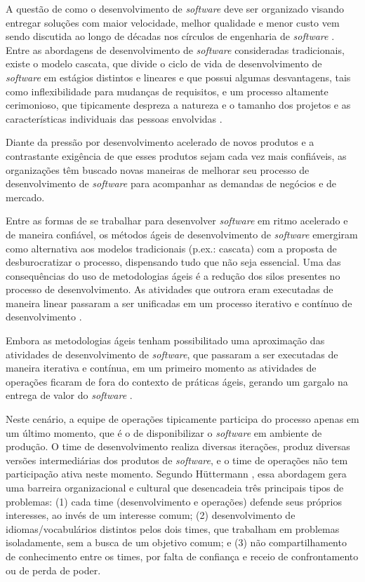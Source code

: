 A questão de como o desenvolvimento de \textit{software} deve ser
organizado visando entregar soluções com maior velocidade, melhor qualidade e
menor custo vem sendo discutida ao longo de décadas nos círculos de engenharia
de \textit{software} \cite{empirical_studies_agile}. Entre as abordagens de
desenvolvimento de \textit{software} consideradas tradicionais, existe o modelo
cascata, que divide o ciclo de vida de desenvolvimento de \textit{software} em
estágios distintos e lineares e que possui algumas desvantagens, tais como
inflexibilidade para mudanças de requisitos, e um processo altamente
cerimonioso, que tipicamente despreza a natureza e o tamanho dos projetos e as características individuais
das pessoas envolvidas \cite{software_quality_agile}.

Diante da pressão por desenvolvimento acelerado de novos produtos e a
contrastante exigência de que esses produtos sejam cada vez mais confiáveis,
as organizações têm buscado novas maneiras de melhorar seu processo de
desenvolvimento de \textit{software} para acompanhar as demandas de negócios e
de mercado.

Entre as formas de se trabalhar para desenvolver \textit{software} em ritmo
acelerado e de maneira confiável, os métodos ágeis de desenvolvimento de
\textit{software} emergiram como alternativa aos modelos tradicionais
(p.ex.: cascata) com a proposta de desburocratizar o processo, dispensando tudo
que não seja essencial. Uma das consequências do uso de metodologias ágeis é a
redução dos silos presentes no processo de desenvolvimento. As atividades que
outrora eram executadas de maneira linear passaram a ser unificadas em um
processo iterativo e contínuo de desenvolvimento \cite{a_decade_of_agile}.

Embora as metodologias ágeis tenham possibilitado uma aproximação das
atividades de desenvolvimento de \textit{software}, que passaram a ser
executadas de maneira iterativa e contínua, em um primeiro momento as atividades
de operações ficaram de fora do contexto de práticas ágeis, gerando um gargalo
na entrega de valor do \textit{software} \cite{understanding_devops}.

Neste cenário, a equipe de operações tipicamente participa do processo
apenas em um último momento, que é o de disponibilizar o
\textit{software} em ambiente de produção. O time de desenvolvimento realiza
diversas iterações, produz diversas versões intermediárias dos produtos de
\textit{software}, e o time de operações não tem participação ativa neste
momento. Segundo H\"uttermann
\cite{devops_for_developers}, essa abordagem gera uma barreira organizacional
e cultural que desencadeia três principais tipos de problemas: (1) cada time
(desenvolvimento e operações) defende seus próprios interesses, ao invés de
um interesse comum; (2) desenvolvimento de idiomas/vocabulários distintos pelos
dois times, que trabalham em problemas isoladamente, sem a busca de um objetivo
comum; e (3) não compartilhamento de conhecimento entre os times, por falta
de confiança e receio de confrontamento ou de perda de poder.

